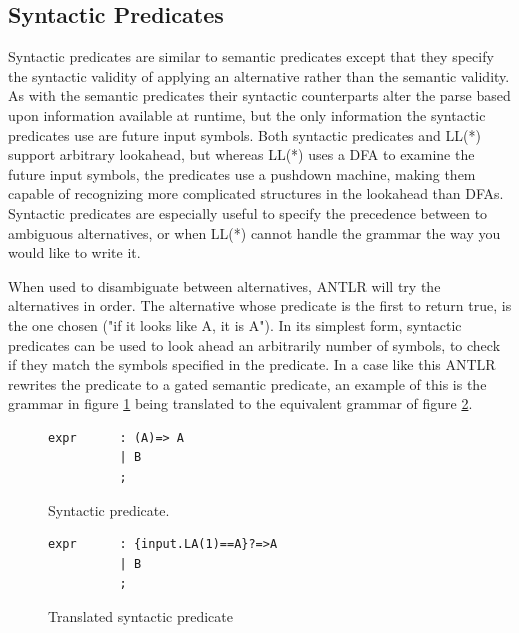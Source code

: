 \subsection{Syntactic Predicates}
Syntactic predicates are similar to semantic predicates except that they specify the syntactic validity of applying an alternative rather than the semantic validity. As with the semantic predicates their syntactic counterparts alter the parse based upon information available at runtime, but the only information the syntactic predicates use are future input symbols.  Both syntactic predicates and LL(*) support arbitrary lookahead, but whereas LL(*) uses a DFA to examine the future input symbols, the predicates use a pushdown machine, making them capable of recognizing more complicated structures in the lookahead than DFAs. Syntactic predicates are especially useful to specify the precedence between to ambiguous alternatives, or when LL(*) cannot handle the grammar the way you would like to write it.

When used to disambiguate between alternatives, ANTLR will try the alternatives in order. The alternative whose predicate is the first to return true, is the one chosen ("if it looks like A, it is A"). In its simplest form, syntactic predicates can be used to look ahead an arbitrarily number of symbols, to check if they match the symbols specified in the predicate. In a case like this ANTLR rewrites the predicate to a gated semantic predicate, an example of this is the grammar in figure \ref{code:syntactic} being translated to the equivalent grammar of figure \ref{code:translatedSyntactic}.

\begin{figure}[h!]
\begin{verbatim}
expr      : (A)=> A 
          | B
          ; 
\end{verbatim}
\caption{Syntactic predicate.}
\label{code:syntactic}
\end{figure}
\begin{figure}[h!]
\begin{verbatim}
expr      : {input.LA(1)==A}?=>A 
          | B
          ; 
\end{verbatim}
\caption{Translated syntactic predicate}
\label{code:translatedSyntactic}
\end{figure}

